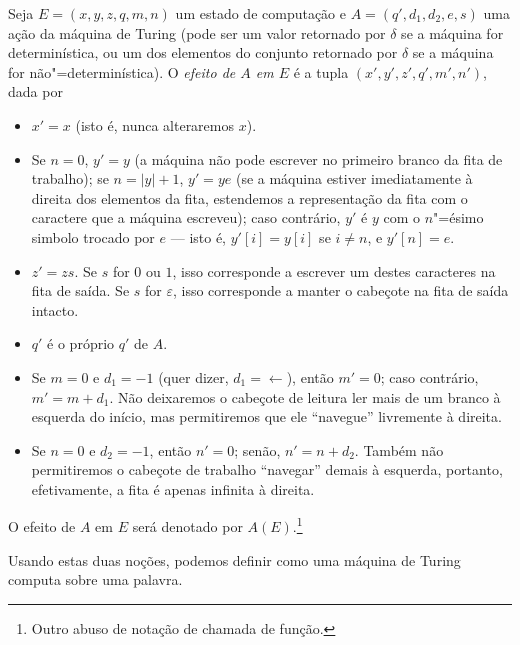 Seja $E = (x, y, z, q, m, n)$ um estado de computação
e $A = (q', d_1, d_2, e, s)$ uma ação da máquina de Turing
(pode ser um valor retornado por $\delta$ se a máquina for determinística,
ou um dos elementos do conjunto retornado por $\delta$
se a máquina for não"=determinística).
O \emph{efeito de $A$ em $E$}
é a tupla $(x', y', z', q', m', n')$,
dada por
\begin{itemize}
    \setlength{\labelsep}{1ex}
    \item $x' = x$ (isto é, nunca alteraremos $x$).
    \item Se $n = 0$, $y' = y$
        (a máquina não pode escrever no primeiro branco da fita de trabalho);
        se $n = |y| + 1$, $y' = ye$
        (se a máquina estiver imediatamente à direita dos elementos da fita,
        estendemos a representação da fita com o caractere que a máquina escreveu);
        caso contrário,
        $y'$ é $y$ com o $n$"=ésimo simbolo trocado por $e$
        --- isto é, $y'[i] = y[i]$ se $i \neq n$, e $y'[n] = e$.
    \item $z' = zs$.
        Se $s$ for $0$ ou $1$,
        isso corresponde a escrever um destes caracteres na fita de saída.
        Se $s$ for $\varepsilon$,
        isso corresponde a manter o cabeçote na fita de saída intacto.
    \item $q'$ é o próprio $q'$ de $A$.
    \item Se $m = 0$ e $d_1 = -1$ (quer dizer, $d_1 = \leftarrow$),
        então $m' = 0$; caso contrário, $m' = m + d_1$.
        Não deixaremos o cabeçote de leitura ler mais de um branco
        à esquerda do início,
        mas permitiremos que ele ``navegue'' livremente à direita.
    \item Se $n = 0$ e $d_2 = -1$, então $n' = 0$; senão, $n' = n + d_2$.
        Também não permitiremos o cabeçote de trabalho ``navegar'' demais à esquerda,
        portanto, efetivamente,
        a fita é apenas infinita à direita.
\end{itemize}
\begin{notation}
    O efeito de $A$ em $E$ será denotado por $A(E)$.\footnote{
        Outro abuso de notação de chamada de função.
    }
\end{notation}

Usando estas duas noções,
podemos definir como uma máquina de Turing computa sobre uma palavra.

